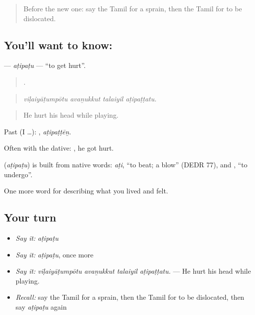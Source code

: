 \label{lesson:TA-C482-atipatu}



\begin{quote}
Before the new one: say the Tamil for a sprain, then the Tamil for to be dislocated.
\end{quote}

\subsection*{You'll want to know: }
\textbf{} — \emph{aṭipaṭu} — \textquotedblleft{}to get hurt\textquotedblright{}.

\begin{quote}
   .
\end{quote}

\begin{quote}
\emph{viḷaiyāṭumpōtu avaṉukkut talaiyil aṭipaṭṭatu.}
\end{quote}

\begin{quote}
He hurt his head while playing.
\end{quote}

Past (I …): , \emph{aṭipaṭṭēṉ}.

Often with the dative:  , he got hurt.

\begin{cousinweb}
\textbf{} (\emph{aṭipaṭu}) is built from native words:  \emph{aṭi}, \textquotedblleft{}to beat; a blow\textquotedblright{} (DEDR 77), and , \textquotedblleft{}to undergo\textquotedblright{}.
\end{cousinweb}

\begin{grammarlens}[title={What you've built}]
One more word for describing what you lived and felt.
\end{grammarlens}

\subsection*{Your turn}
\begin{itemize}
\raggedright
  \item \emph{Say it:} \emph{aṭipaṭu}
  \item \emph{Say it:} \emph{aṭipaṭu}, once more
  \item \emph{Say it:} \emph{viḷaiyāṭumpōtu avaṉukkut talaiyil aṭipaṭṭatu.} — He hurt his head while playing.
  \item \emph{Recall:} say the Tamil for a sprain, then the Tamil for to be dislocated, then say \emph{aṭipaṭu} again
\end{itemize}

